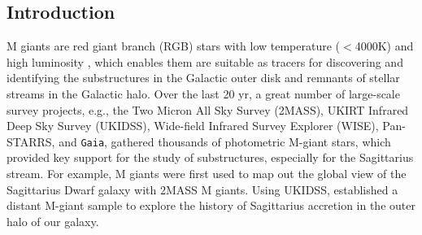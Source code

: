 \documentclass[manuscript]{aastex62}
\newcommand{\gaia}{\texttt{Gaia}}
\begin{document}
\begin{CJK*}{UTF8}{gbsn}

\section{Introduction}
\label{sec:intro}
M giants are red giant branch (RGB) stars with low temperature ($<$4000K) and high luminosity \citep[log $L/L_{\sun}$ $\sim$ 3-4;][]{2009ssc..book.....G}, which enables them are suitable as tracers for discovering and identifying the substructures in the Galactic outer disk and remnants of stellar streams in the Galactic halo. Over the last 20 yr, a great number of large-scale survey projects, e.g., the Two Micron All Sky Survey (2MASS), UKIRT Infrared Deep Sky Survey (UKIDSS), Wide-field Infrared Survey Explorer (WISE), Pan-STARRS, and \gaia{}, gathered thousands of photometric M-giant stars, which provided key support for the study of substructures, especially for the Sagittarius stream. For example, M giants were first used to map out the global view of the Sagittarius Dwarf galaxy \citep{2003ApJ...599.1082M} with 2MASS M giants. Using UKIDSS, \citet{2014AJ....147...76B} established a distant M-giant sample to explore the history of Sagittarius accretion in the outer halo of our galaxy.


\end{CJK*}
\end{document}

